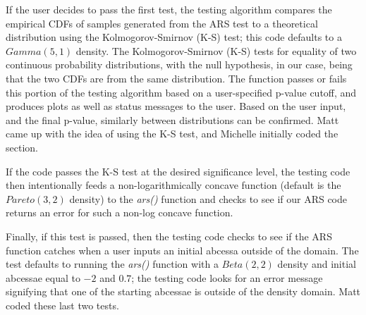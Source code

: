 \documentclass{article}
\begin{document}
If the user decides to pass the first test, the testing algorithm compares the empirical CDFs of samples generated from the ARS test to a theoretical distribution using the Kolmogorov-Smirnov (K-S) test; this code defaults to a $Gamma\left(5,1\right)$ density.  The Kolmogorov-Smirnov (K-S) tests for equality of two continuous probability distributions, with the null hypothesis, in our case, being that the two CDFs are from the same distribution. The function passes or fails this portion of the testing algorithm based on a user-specified p-value cutoff, and produces plots as well as status messages to the user.  Based on the user input, and the final p-value, similarly between distributions can be confirmed. Matt came up with the idea of using the K-S test, and Michelle initially coded the section.

If the code passes the K-S test at the desired significance level, the testing code then intentionally feeds a non-logarithmically concave function (default is the $Pareto\left(3,2\right)$ density) to the \textit{ars()} function and checks to see if our ARS code returns an error for such a non-log concave function.

Finally, if this test is passed, then the testing code checks to see if the ARS function catches when a user inputs an initial abcessa outside of the domain.  The test defaults to running the \textit{ars()} function with a $Beta\left(2,2\right)$ density and initial abcessae equal to $-2$ and $0.7$; the testing code looks for an error message signifying that one of the starting abcessae is outside of the density domain.  Matt coded these last two tests.
\end{document}

